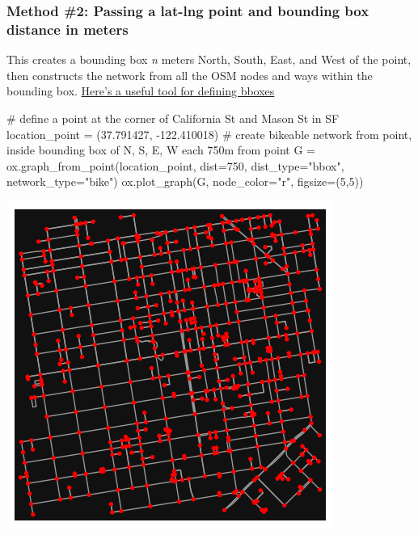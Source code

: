 \documentclass[
  letterpaper,
  DIV=11,
  numbers=noendperiod]{scrreprt}
\newenvironment{Shaded}{\begin{snugshade}}{\end{snugshade}}
\newcommand{\CommentTok}[1]{\textcolor[rgb]{0.37,0.37,0.37}{#1}}
\newcommand{\DecValTok}[1]{\textcolor[rgb]{0.68,0.00,0.00}{#1}}
\newcommand{\FloatTok}[1]{\textcolor[rgb]{0.68,0.00,0.00}{#1}}
\newcommand{\NormalTok}[1]{\textcolor[rgb]{0.00,0.23,0.31}{#1}}
\newcommand{\OperatorTok}[1]{\textcolor[rgb]{0.37,0.37,0.37}{#1}}
\newcommand{\StringTok}[1]{\textcolor[rgb]{0.13,0.47,0.30}{#1}}
\begin{document}
\subsubsection{Method \#2: Passing a lat-lng point and bounding box
distance in
meters}\label{method-2-passing-a-lat-lng-point-and-bounding-box-distance-in-meters}

This creates a bounding box \emph{n} meters North, South, East, and West
of the point, then constructs the network from all the OSM nodes and
ways within the bounding box. \href{https://bboxfinder.com}{Here's a
useful tool for defining bboxes}

\begin{Shaded}
\begin{Highlighting}[]
\CommentTok{\# define a point at the corner of California St and Mason St in SF}
\NormalTok{location\_point }\OperatorTok{=}\NormalTok{ (}\FloatTok{37.791427}\NormalTok{, }\OperatorTok{{-}}\FloatTok{122.410018}\NormalTok{)}
\CommentTok{\# create bikeable network from point, inside bounding box of N, S, E, W each 750m from point}
\NormalTok{G }\OperatorTok{=}\NormalTok{ ox.graph\_from\_point(location\_point, dist}\OperatorTok{=}\DecValTok{750}\NormalTok{, dist\_type}\OperatorTok{=}\StringTok{"bbox"}\NormalTok{, network\_type}\OperatorTok{=}\StringTok{"bike"}\NormalTok{)}
\NormalTok{ox.plot\_graph(G, node\_color}\OperatorTok{=}\StringTok{"r"}\NormalTok{, figsize}\OperatorTok{=}\NormalTok{(}\DecValTok{5}\NormalTok{,}\DecValTok{5}\NormalTok{))}
\end{Highlighting}
\end{Shaded}

\includegraphics{labs/w07_OSM_files/figure-pdf/cell-7-output-1.png}
\end{document}
